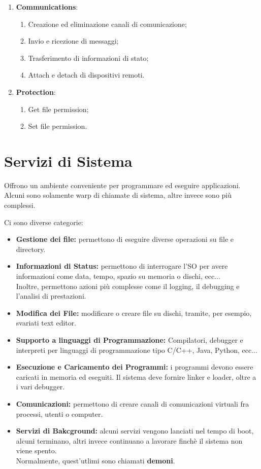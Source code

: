 \begin{enumerate}
\begin{enumerate}
    \end{enumerate}
  \item \textbf{Communications}:
    \begin{enumerate}
      \item Creazione ed eliminazione canali di comunicazione;
      \item Invio e ricezione di messaggi;
      \item Trasferimento di informazioni di stato;
      \item Attach e detach di dispositivi remoti.
    \end{enumerate}
  \item \textbf{Protection}:
    \begin{enumerate}
      \item Get file permission;
      \item Set file permission.
    \end{enumerate}
\end{enumerate}

\section{Servizi di Sistema}
\begin{defn}
Offrono un ambiente conveniente per programmare ed eseguire applicazioni. \\ 
Alcuni sono solamente warp di chiamate di sistema, altre invece sono più complessi.
\end{defn}
Ci sono diverse categorie:
\begin{itemize}
  \item \textbf{Gestione dei file:} permettono di eseguire diverse operazioni su file e directory.
  \item \textbf{Informazioni di Status:} permettono di interrogare l'SO per avere informazioni come data, tempo, spazio su memoria o dischi, ecc... \\ 
    Inoltre, permettono azioni più complesse come il logging, il debugging e l'analisi di prestazioni.
  \item \textbf{Modifica dei File:} modificare o creare file su dischi, tramite, per esempio, svariati text editor.
  \item \textbf{Supporto a linguaggi di Programmazione:} Compilatori, debugger e interpreti per linguaggi di programmazione tipo C/C++, Java, Python, ecc...
  \item \textbf{Esecuzione e Caricamento dei Programmi:} i programmi devono essere caricati in memoria ed eseguiti. Il sistema deve fornire linker e loader, oltre a i vari debugger.
  \item \textbf{Comunicazioni:} permettono di creare canali di comunicazioni virtuali fra processi, utenti o computer.
  \item \textbf{Servizi di Bakcground:} alcuni servizi vengono lanciati nel tempo di boot, alcuni terminano, altri invece continuano a lavorare finchè il sistema non viene spento. \\ 
    Normalmente, quest'utlimi sono chiamati \textbf{demoni}.
\end{itemize}

